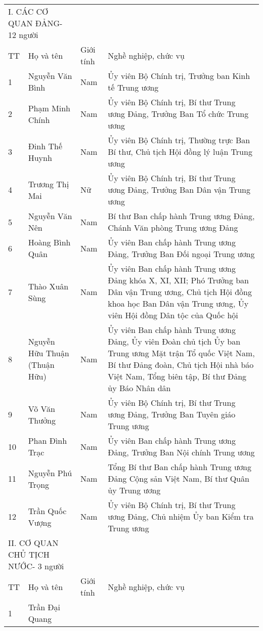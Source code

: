 \begin{longtable}{p{}p{}p{}p{}}
\multicolumn{2}{l}{I. CÁC CƠ QUAN ĐẢNG- 12 người} &
 &
 \\
TT &
  Họ và tên &
  Giới tính &
  Nghề nghiệp, chức vụ \\
1 &
  Nguyễn Văn Bình &
  Nam &
  Ủy viên Bộ Chính trị, Trưởng ban Kinh tế Trung ương \\
2 &
  Phạm Minh Chính &
  Nam &
  Ủy viên Bộ Chính trị, Bí thư Trung ương Đảng, Trưởng Ban Tổ chức Trung ương \\
3 &
  Đinh Thế Huynh &
  Nam &
  Ủy viên Bộ Chính trị, Thường trực Ban Bí thư, Chủ tịch Hội đồng lý luận Trung ương \\
4 &
  Trương Thị Mai &
  Nữ &
  Ủy viên Bộ Chính trị, Bí thư Trung ương Đảng, Trưởng Ban Dân vận Trung ương \\
5 &
  Nguyễn Văn Nên &
  Nam &
  Bí thư Ban chấp hành Trung ương Đảng, Chánh Văn phòng Trung ương Đảng \\
6 &
  Hoàng Bình Quân &
  Nam &
  Ủy viên Ban chấp hành Trung ương Đảng, Trưởng Ban Đối ngoại Trung ương \\
7 &
  Thào Xuân Sùng &
  Nam &
  Ủy viên Ban chấp hành Trung ương Đảng khóa X, XI, XII; Phó Trưởng ban Dân vận Trung ương, Chủ tịch Hội đồng khoa học Ban Dân vận Trung ương, Ủy viên Hội đồng Dân tộc của Quốc hội \\
8 &
  Nguyễn Hữu Thuận (Thuận Hữu) &
  Nam &
  Ủy viên Ban chấp hành Trung ương Đảng, Ủy viên Đoàn chủ tịch Ủy ban Trung ương Mặt trận Tổ quốc Việt Nam, Bí thư Đảng đoàn, Chủ tịch Hội nhà báo Việt Nam, Tổng biên tập, Bí thư Đảng ủy Báo Nhân dân \\
9 &
  Võ Văn Thưởng &
  Nam &
  Ủy viên Bộ Chính trị, Bí thư Trung ương Đảng, Trưởng Ban Tuyên giáo Trung ương \\
10 &
  Phan Đình Trạc &
  Nam &
  Ủy viên Ban chấp hành Trung ương Đảng, Trưởng Ban Nội chính Trung ương \\
11 &
  Nguyễn Phú Trọng &
  Nam &
  Tổng Bí thư Ban chấp hành Trung ương Đảng Cộng sản Việt Nam, Bí thư Quân ủy Trung ương \\
12 &
  Trần Quốc Vượng &
  Nam &
  Ủy viên Bộ Chính trị, Bí thư Trung ương Đảng, Chủ nhiệm Ủy ban Kiểm tra Trung ương \\
\multicolumn{2}{l}{II. CƠ QUAN CHỦ TỊCH NƯỚC- 3 người} &
 &
 \\
TT &
  Họ và tên &
  Giới tính &
  Nghề nghiệp, chức vụ \\
1 &
  Trần Đại Quang &

\end{longtable}
